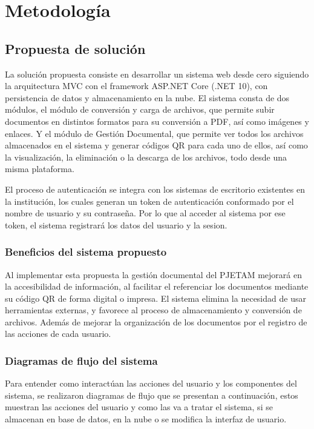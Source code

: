 \section{Metodología}
\subsection{Propuesta de solución}
\label{propuesta_solucion}
La solución propuesta consiste en desarrollar un sistema web desde cero siguiendo la arquitectura MVC con el framework ASP.NET Core (.NET 10), con persistencia de datos y almacenamiento en la nube. El sistema consta de dos módulos, el módulo de conversión y carga de archivos, que permite subir documentos en distintos formatos para su conversión a PDF, así como imágenes y enlaces. Y el módulo de Gestión Documental, que permite ver todos los archivos almacenados en el sistema y generar códigos QR para cada uno de ellos, así como la visualización, la eliminación o la descarga de los archivos, todo desde una misma plataforma.

El proceso de autenticación se integra con los sistemas de escritorio existentes en la institución, los cuales generan un token de autenticación conformado por el nombre de usuario y su contraseña. Por lo que al acceder al sistema por ese token, el sistema registrará los datos del usuario y la sesion.

\subsubsection{Beneficios del sistema propuesto}
Al implementar esta propuesta la gestión documental del PJETAM mejorará en la accesibilidad de información, al facilitar el referenciar los documentos mediante su código QR de forma digital o impresa. El sistema elimina la necesidad de usar herramientas externas, y favorece al proceso de almacenamiento y conversión de archivos. Además de mejorar la organización de los documentos por el registro de las acciones de cada usuario.

\subsubsection{Diagramas de flujo del sistema}
Para entender como interactúan las acciones del usuario y los componentes del sistema, se realizaron diagramas de flujo que se presentan a continuación, estos muestran las acciones del usuario y como las va a tratar el sistema, si se almacenan en base de datos, en la nube o se modifica la interfaz de usuario.

